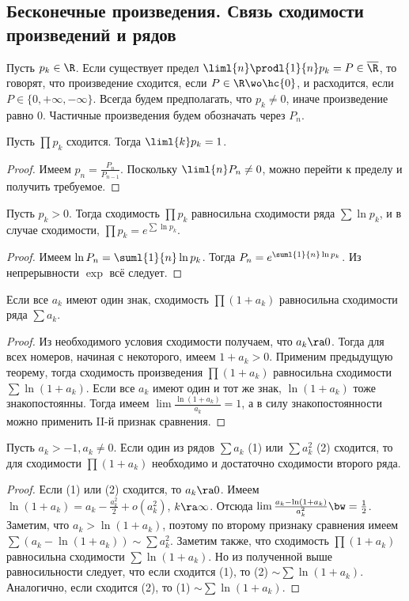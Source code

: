 \documentclass[a4paper]{article}
\begin{document}
\subsection{Бесконечные произведения. Связь сходимости произведений и рядов}

Пусть $p_k \in \R$. Если существует предел $\liml{n}\prodl{1}{n}p_k = P \in \overline{\R}$, то
говорят, что произведение сходится, если $P \in \R \wo \hc{0}$, и расходится, если $P \in \{0,+\infty,-\infty\}$. Всегда будем предполагать,
что $p_k \neq 0$, иначе произведение равно 0. Частичные произведения будем обозначать через $P_n$.

\begin{theorem}
Пусть $\prod p_k$ сходится. Тогда $\liml{k}p_k=1$.
\end{theorem}
\begin{proof}
Имеем $p_n=\frac{P_{n}}{P_{n-1}}$. Поскольку $\liml{n} P_n \neq 0$, можно перейти к пределу и получить требуемое.
\end{proof}

\begin{theorem}
Пусть $p_k > 0$. Тогда сходимость $\prod p_k$ равносильна сходимости ряда $\sum \ln p_k$, и в случае сходимости, $\prod p_k = e^{\sum \ln p_k}$.
\end{theorem}
\begin{proof}
Имеем $\ln P_n= \suml{1}{n} \ln p_k$. Тогда $P_n=e^{\suml{1}{n} \ln p_k}$. Из непрерывности $\exp$ всё следует.
\end{proof}

\begin{theorem}
Если все $a_k$ имеют один знак, сходимость $\prod (1+a_k)$ равносильна сходимости ряда $\sum a_k$.
\end{theorem}
\begin{proof}
Из необходимого условия сходимости получаем, что $a_k \ra 0$. Тогда для всех номеров, начиная с некоторого,
имеем $1 + a_k > 0$. Применим предыдущую теорему, тогда сходимость произведения $\prod (1+a_k)$ равносильна
сходимости $\sum \ln (1 + a_k)$. Если все $a_k$ имеют один и тот же знак, $\ln(1+a_k)$ тоже знакопостоянны. Тогда имеем
$\lim \frac{\ln(1+ a_k)}{a_k}=1$, а в силу знакопостоянности можно применить II-й признак сравнения.
\end{proof}

\begin{theorem}
Пусть $a_k > -1, a_k \neq 0$. Если один из рядов $\sum a_k$ (1) или $\sum a_k^2$ (2) сходится, то для сходимости
$\prod (1+a_k)$ необходимо и достаточно сходимости второго ряда.
\end{theorem}
\begin{proof}
Если (1) или (2) сходится, то $a_k \ra 0$. Имеем $\ln (1+ a_k) = a_k - \frac{a_k^2}{2}+o(a_k^2)$, $k \ra \infty$.
Отсюда $\lim \frac{a_k - \ln(1+a_k)}{a_k^2}\bw=\frac{1}{2}$. Заметим, что $a_k > \ln(1+a_k)$, поэтому по второму признаку
сравнения имеем $\sum (a_k - \ln(1+a_k)) \sim \sum a_k^2$. Заметим также, что сходимость $\prod (1+a_k)$ равносильна
сходимости $\sum \ln(1+a_k)$. Но из полученной выше равносильности следует, что если сходится (1), то (2) $\sim \sum \ln(1+a_k)$.
Аналогично, если сходится (2), то (1) $\sim \sum \ln(1+a_k)$.
\end{proof}
\end{document}
